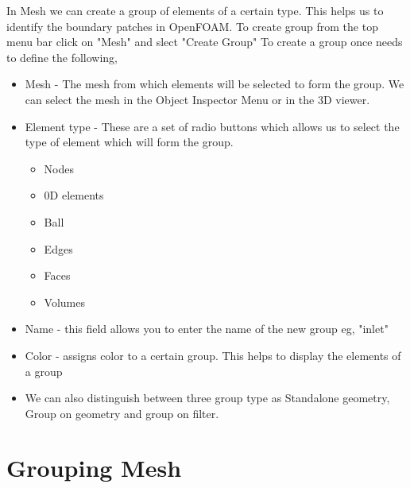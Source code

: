 In Mesh we can create a group of elements of a certain type. This helps us to identify the boundary patches in OpenFOAM. To create group from the top menu bar click on "Mesh" and slect "Create Group" To create a group once needs to define the following, \newline
\begin{itemize}
\item Mesh - The mesh from which elements will be selected to form the group. We can select the mesh in the Object Inspector Menu or in the 3D viewer.
\item Element type - These are a set of radio buttons which allows us to select the type of element which will form the group.
\begin{itemize}
\item Nodes
\item 0D elements
\item Ball
\item Edges
\item Faces
\item Volumes
\end{itemize}
\item Name - this field allows you to enter the name of the new group eg, "inlet"
\item Color - assigns color to a certain group. This helps to display the elements of a group
\item We can also distinguish between three group type as Standalone geometry, Group on geometry and group on filter.
\end{itemize}
 

\section{Grouping Mesh}

